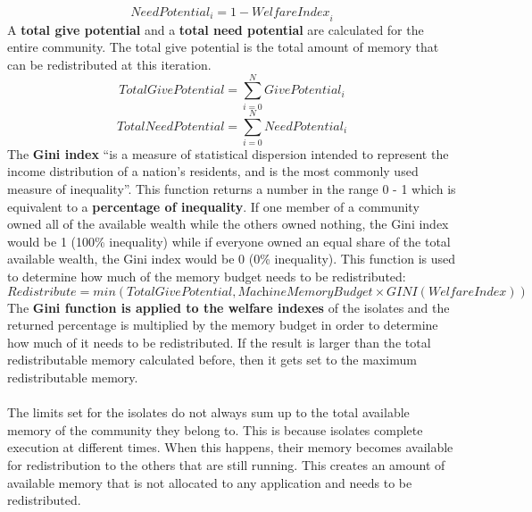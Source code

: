 \documentclass{l4proj}
\begin{document}
\begin{equation}
\textit{NeedPotential}_i = 1 - \textit{WelfareIndex}_i
\end{equation}
A \textbf{total give potential} and a \textbf{total need potential} are calculated for the entire community. The total give potential is the total amount of memory that can be redistributed at this iteration.
\begin{equation}
\textit{TotalGivePotential} = \sum_{i=0}^{N}\textit{GivePotential}_i
\end{equation}
\begin{equation}
\textit{TotalNeedPotential} = \sum_{i=0}^{N}\textit{NeedPotential}_i
\end{equation}
\hspace*{1em} The \textbf{Gini index} ``is a measure of statistical dispersion intended to represent the income distribution of a nation's residents, and is the most commonly used measure of inequality''\cite{gini}. This function returns a number in the range 0 - 1 which is equivalent to a \textbf{percentage of inequality}. If one member of a community owned all of the available wealth while the others owned nothing, the Gini index would be 1 (100\% inequality) while if everyone owned an equal share of the total available wealth, the Gini index would be 0 (0\% inequality). This function is used to determine how much of the memory budget needs to be redistributed:
\begin{equation}
\textit{Redistribute} = min(TotalGivePotential,\textit{MachineMemoryBudget} \times \textit{GINI}(\textit{WelfareIndex}))
\end{equation}
\hspace*{1em} The \textbf{Gini function is applied to the welfare indexes} of the isolates and the returned percentage is multiplied by the memory budget in order to determine how much of it needs to be redistributed. If the result is larger than the total redistributable memory calculated before, then it gets set to the maximum redistributable memory.
\\\\
\hspace*{1em} The limits set for the isolates do not always sum up to the total available memory of the community they belong to. This is because isolates complete execution at different times. When this happens, their memory becomes available for redistribution to the others that are still running. This creates an amount of available memory that is not allocated to any application and needs to be redistributed.
\end{document}
